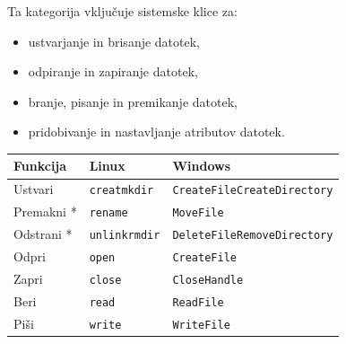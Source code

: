 \documentclass[a4paper,12pt,openright]{book}
\begin{document}
Ta kategorija vključuje sistemske klice za:
\begin{itemize}
	\item ustvarjanje in brisanje datotek,
	\item odpiranje in zapiranje datotek,
	\item branje, pisanje in premikanje datotek,
	\item pridobivanje in nastavljanje atributov datotek. \cite{Silberschatz_Galvin_Gagne_2018}
\end{itemize}

\begin{table}[h!]
	\begin{center}
		\begin{tabular}{ p{3.7cm}|p{2.5cm}|p{6cm} }
			Funkcija           & Linux                                                                                          & Windows                                                           \\
			\hline
			Ustvari            & \verb|creat|\newline\verb|mkdir|                                                               & \verb|CreateFile|\newline\verb|CreateDirectory|                   \\
			Premakni *         & \verb|rename|                                                                                  & \verb|MoveFile|                                                   \\
			Odstrani *         & \verb|unlink|\newline\verb|rmdir|                                                              & \verb|DeleteFile|\newline\verb|RemoveDirectory|                   \\
			Odpri              & \verb|open|                                                                                    & \verb|CreateFile|                                                 \\
			Zapri              & \verb|close|                                                                                   & \verb|CloseHandle|                                                \\
			Beri               & \verb|read|                                                                                    & \verb|ReadFile|                                                   \\
			Piši              & \verb|write|                                                                                   & \verb|WriteFile|                                                  \\

\end{tabular}
\end{center}
\end{table}
\end{document}
